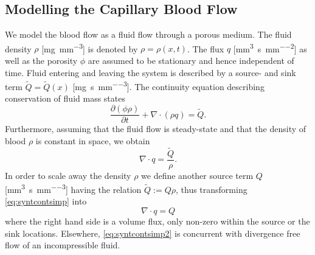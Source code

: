\documentclass[paper=a4, fontsize=11pt,parskip=half,headings=small]{scrartcl}
\newcommand{\siQmm}{\milli\meter\cubed\per\second\per\milli\meter\cubed}
\newcommand{\siq}{\milli\meter\cubed\per\second\per\milli\meter\squared}
\newcommand{\sirho}{\milli\gram\per\milli\meter\cubed}
\newcommand{\siQtilde}{\milli\gram\per\second\per\milli\meter\cubed}
\begin{document}
	\subsection{Modelling the Capillary Blood Flow}\label{sec:flow}
	
	We model the blood flow as a fluid flow through a porous medium. 
	The fluid density $\rho$ [\si{\sirho}] is denoted by $\rho = \rho(x,t)$.
	The flux $q$ [\si{\siq}] as well as the porosity $\phi$ are assumed to be stationary and hence independent of time.
	Fluid entering and leaving the system is described by a source- and sink term $\tilde{Q} = \tilde{Q}(x)$ [\si{\siQtilde}]. 
	The continuity equation describing conservation of fluid mass states
	\begin{equation}
		\frac{\partial (\phi \rho)}{\partial t} + \nabla \cdot (\rho q) = \tilde{Q}.
		\label{eq:syntcont}
	\end{equation} 
	Furthermore, assuming that the fluid flow is steady-state and that the density of blood $\rho$ is constant in space, we obtain
	\begin{equation}
		\nabla \cdot q = \frac{\tilde{Q}}{\rho}.
		\label{eq:syntcontsimp}
	\end{equation}
	In order to scale away the density $\rho$ we define another source term $Q$ [\si{\siQmm}] having the relation $\tilde{Q} := Q\rho$, thus transforming \eqref{eq:syntcontsimp} into
	\begin{equation}
		\nabla \cdot q = Q
		\label{eq:syntcontsimp2}
	\end{equation}
	where the right hand side is a volume flux, only non-zero within the source or the sink locations. 
	Elsewhere, \eqref{eq:syntcontsimp2} is concurrent with divergence free flow of an incompressible fluid.
	
\end{document}
